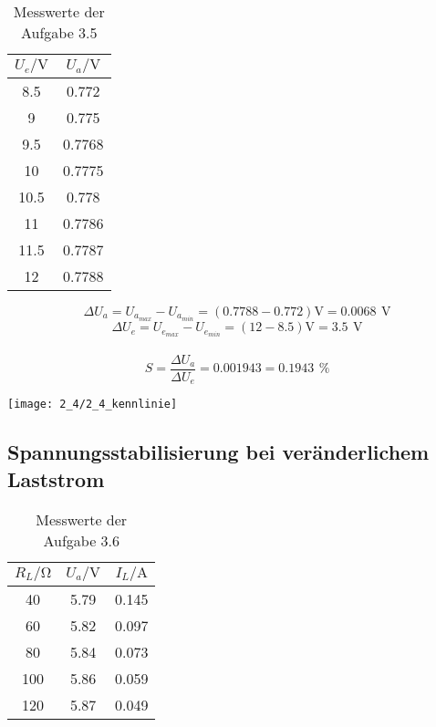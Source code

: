 \documentclass[a4paper, 12pt]{article}
\begin{document}
\begin{table}[H]
\begin{center}
\begin{tabular}{c|c}
\toprule
$U_e / \si{\volt} $ & $U_a / \si{\volt}$ \\\midrule
8.5                                               & 0.772                                             \\
9                                                 & 0.775                                             \\
9.5                                               & 0.7768                                            \\
10                                                & 0.7775                                            \\
10.5                                              & 0.778                                             \\
11                                                & 0.7786                                            \\
11.5                                              & 0.7787                                            \\
12                                                & 0.7788                 \\\bottomrule 
\end{tabular}
\end{center}
\caption{Messwerte der Aufgabe 3.5}
\end{table}

$$ \Delta U_a = U_{a_{max}} - U_{a_{min}} = (0.7788 - 0.772) \si{\volt} =
0.0068 \,\ \si{\volt}$$
$$ \Delta U_e = U_{e_{max}} - U_{e_{min}} = (12 - 8.5) \si{\volt} = 3.5 \,\ \si{\volt}$$\\
$$S = \frac{\Delta U_a}{\Delta U_e} = 0.001943 = 0.1943 \,\ \si{\percent}$$

\begin{center}
 \texttt{[image: 2\_4/2\_4\_kennlinie]}
\end{center}


\subsection{Spannungsstabilisierung bei veränderlichem Laststrom}
\begin{table}[H]
\begin{center}
\begin{tabular}{@{}c|c|c@{}}
\toprule
$R_L / \si{\ohm}$   & $U_a / \si{\volt}$ & $I_L / \si{\ampere}$                   \\ \midrule
40  & 5.79    & 0.145              \\
60  & 5.82    & 0.097                \\
80  & 5.84    & 0.073                \\
100 & 5.86    & 0.059 \\
120 & 5.87    & 0.049 \\ \bottomrule
\end{tabular}
\end{center}
\caption{Messwerte der Aufgabe 3.6}
\end{table}
\end{document}
